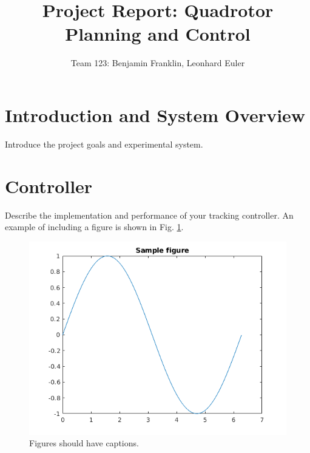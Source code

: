 \documentclass[letterpaper, 10 pt, conference]{ieeeconf}
\title{Project Report: Quadrotor Planning and Control}
\author{Team 123: Benjamin Franklin, Leonhard Euler}
\begin{document}
\maketitle


\section{Introduction and System Overview}

Introduce the project goals and experimental system.

\section{Controller}

Describe the implementation and performance of your tracking controller.
An example of including a figure is shown in Fig. \ref{fig:example_figure}.

\begin{figure}[h]
  \centering
    \includegraphics[width=\linewidth]{sample_figure}
  \caption{Figures should have captions.}
  \label{fig:example_figure}
\end{figure}
\end{document}
